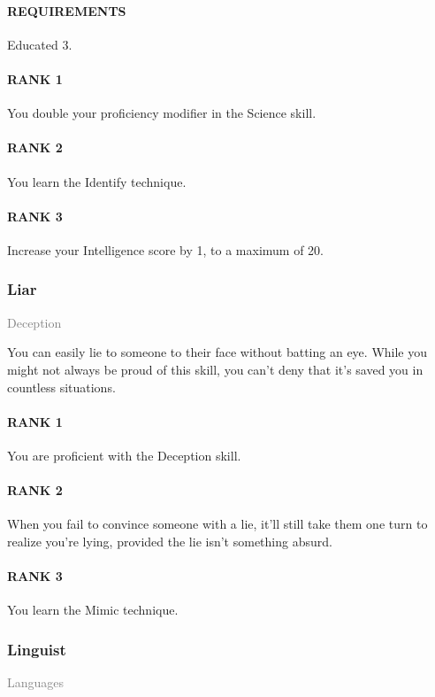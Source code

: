 \paragraph{REQUIREMENTS} Educated 3.
\paragraph{RANK 1} You double your proficiency modifier in the Science skill.
\paragraph{RANK 2} You learn the Identify technique.
\paragraph{RANK 3} Increase your Intelligence score by 1, to a maximum of 20.

\subsubsection{Liar} \label{feat::liar}
\small{\textcolor{gray}{Deception}}

\normalsize
You can easily lie to someone to their face without batting an eye.
While you might not always be proud of this skill, you can't deny that it's saved you in countless situations.
\paragraph{RANK 1} You are proficient with the Deception skill.
\paragraph{RANK 2} When you fail to convince someone with a lie, it'll still take them one turn to realize you're lying, provided the lie isn't something absurd.
\paragraph{RANK 3} You learn the Mimic technique.

\subsubsection{Linguist} \label{feat::linguist}
\small{\textcolor{gray}{Languages}}

